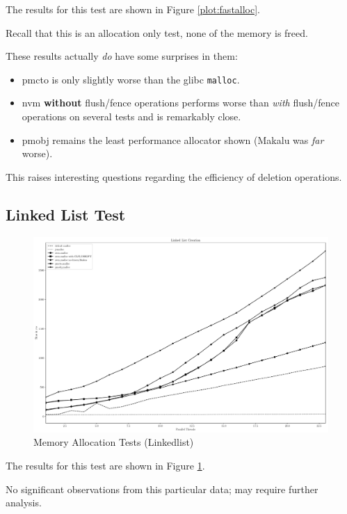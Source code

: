 The results for this test are shown in Figure \ref{plot:fastalloc}.

Recall that this is an allocation only test, none of the
memory is freed.

These results actually \textit{do} have some surprises in them:

\begin{itemize}
    \item pmcto is only slightly worse than the glibc \texttt{malloc}.
    \item nvm \textbf{without} flush/fence operations performs worse than \textit{with} flush/fence operations on several tests and is remarkably close.
    \item pmobj remains the least performance allocator shown (Makalu was \textit{far} worse).
\end{itemize}

This raises interesting questions regarding the efficiency of deletion operations.

\subsection{Linked List Test}\label{section:results:malloc:ll}

\begin{figure}
    \centering
    \caption{Memory Allocation Tests (Linkedlist)}\label{plot:linkedlist}
    \includegraphics[scale=0.35]{malloc/linkedlist.pdf}
\end{figure}

The results for this test are shown in Figure 
\ref{plot:linkedlist}.

No significant observations from this particular data; may require further analysis.


